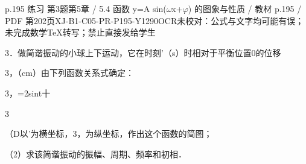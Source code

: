 \begin{bankitem}{p.195 练习 第3题}{第5章 / 5.4 函数 y=A sin(\ensuremath{\omega}x+\ensuremath{\varphi}) 的图象与性质 / 教材 p.195 / PDF 第202页}{XJ-B1-C05-PR-P195-Y1290}{OCR未校对：公式与文字均可能有误；未完成数学TeX转写；禁止直接发给学生}
\begin{ocrdraft}
\par
3．做简谐振动的小球上下运动，它在时刻'（s）时相对于平衡位置0的位移
\par
3，（cm）由下列函数关系式确定：
\par
3，=2sint十
\par
3
\par
（D以'为横坐标，3，为纵坐标，作出这个函数的简图；
\par
（2）求该简谐振动的振幅、周期、频率和初相．
\end{ocrdraft}
\end{bankitem}
